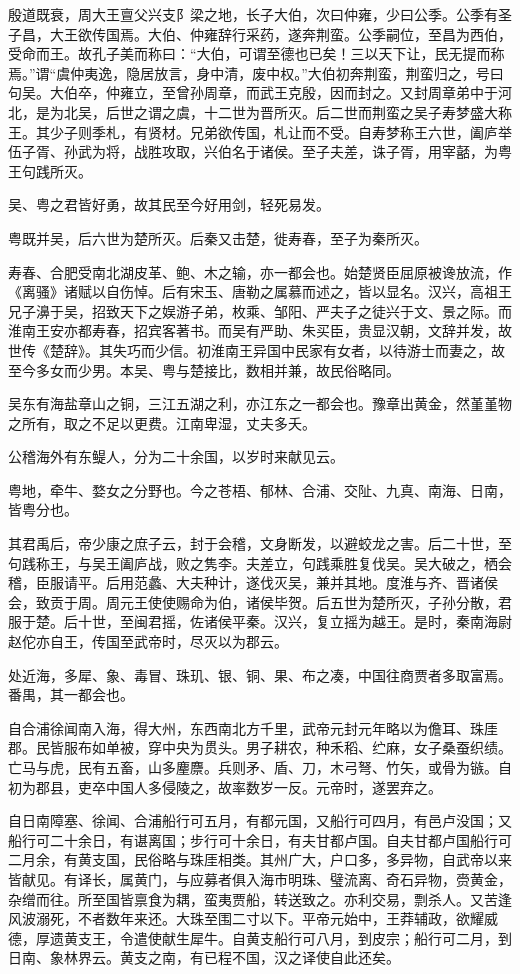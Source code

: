 \documentclass[]{article}
\begin{document}
殷道既衰，周大王亶父兴支阝梁之地，长子大伯，次曰仲雍，少曰公季。公季有圣子昌，大王欲传国焉。大伯、仲雍辞行采药，遂奔荆蛮。公季嗣位，至昌为西伯，受命而王。故孔子美而称曰：``大伯，可谓至德也已矣！三以天下让，民无提而称焉。''谓``虞仲夷逸，隐居放言，身中清，废中权。''大伯初奔荆蛮，荆蛮归之，号曰句吴。大伯卒，仲雍立，至曾孙周章，而武王克殷，因而封之。又封周章弟中于河北，是为北吴，后世之谓之虞，十二世为晋所灭。后二世而荆蛮之吴子寿梦盛大称王。其少子则季札，有贤材。兄弟欲传国，札让而不受。自寿梦称王六世，阖庐举伍子胥、孙武为将，战胜攻取，兴伯名于诸侯。至子夫差，诛子胥，用宰嚭，为粤王句践所灭。

吴、粤之君皆好勇，故其民至今好用剑，轻死易发。

粤既并吴，后六世为楚所灭。后秦又击楚，徙寿春，至子为秦所灭。

寿春、合肥受南北湖皮革、鲍、木之输，亦一都会也。始楚贤臣屈原被谗放流，作《离骚》诸赋以自伤悼。后有宋玉、唐勒之属慕而述之，皆以显名。汉兴，高祖王兄子濞于吴，招致天下之娱游子弟，枚乘、邹阳、严夫子之徒兴于文、景之际。而淮南王安亦都寿春，招宾客著书。而吴有严助、朱买臣，贵显汉朝，文辞并发，故世传《楚辞》。其失巧而少信。初淮南王异国中民家有女者，以待游士而妻之，故至今多女而少男。本吴、粤与楚接比，数相并兼，故民俗略同。

吴东有海盐章山之铜，三江五湖之利，亦江东之一都会也。豫章出黄金，然堇堇物之所有，取之不足以更费。江南卑湿，丈夫多夭。

公稽海外有东鳀人，分为二十余国，以岁时来献见云。

粤地，牵牛、婺女之分野也。今之苍梧、郁林、合浦、交阯、九真、南海、日南，皆粤分也。

其君禹后，帝少康之庶子云，封于会稽，文身断发，以避蛟龙之害。后二十世，至句践称王，与吴王阖庐战，败之隽李。夫差立，句践乘胜复伐吴。吴大破之，栖会稽，臣服请平。后用范蠡、大夫种计，遂伐灭吴，兼并其地。度淮与齐、晋诸侯会，致贡于周。周元王使使赐命为伯，诸侯毕贺。后五世为楚所灭，子孙分散，君服于楚。后十世，至闽君摇，佐诸侯平秦。汉兴，复立摇为越王。是时，秦南海尉赵佗亦自王，传国至武帝时，尽灭以为郡云。

处近海，多犀、象、毒冒、珠玑、银、铜、果、布之凑，中国往商贾者多取富焉。番禺，其一都会也。

自合浦徐闻南入海，得大州，东西南北方千里，武帝元封元年略以为儋耳、珠厓郡。民皆服布如单被，穿中央为贯头。男子耕农，种禾稻、纻麻，女子桑蚕织绩。亡马与虎，民有五畜，山多麈麖。兵则矛、盾、刀，木弓弩、竹矢，或骨为镞。自初为郡县，吏卒中国人多侵陵之，故率数岁一反。元帝时，遂罢弃之。

自日南障塞、徐闻、合浦船行可五月，有都元国，又船行可四月，有邑卢没国；又船行可二十余日，有谌离国；步行可十余日，有夫甘都卢国。自夫甘都卢国船行可二月余，有黄支国，民俗略与珠厓相类。其州广大，户口多，多异物，自武帝以来皆献见。有译长，属黄门，与应募者俱入海市明珠、璧流离、奇石异物，赍黄金，杂缯而往。所至国皆禀食为耦，蛮夷贾船，转送致之。亦利交易，剽杀人。又苦逢风波溺死，不者数年来还。大珠至围二寸以下。平帝元始中，王莽辅政，欲耀威德，厚遗黄支王，令遣使献生犀牛。自黄支船行可八月，到皮宗；船行可二月，到日南、象林界云。黄支之南，有已程不国，汉之译使自此还矣。
\end{document}
